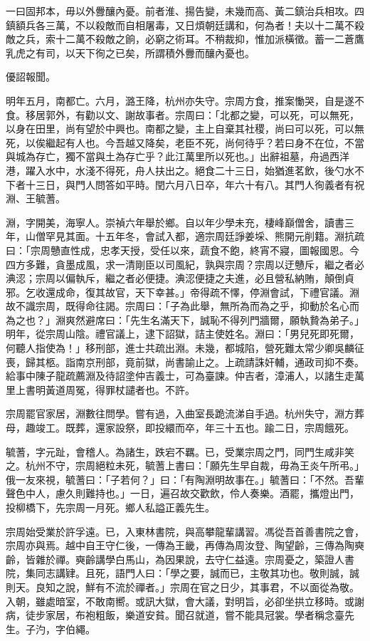 \begin{pinyinscope}
一曰固邦本，毋以外釁釀內憂。前者淮、揚告變，未幾而高、黃二鎮治兵相攻。四鎮額兵各三萬，不以殺敵而自相屠毒，又日煩朝廷講和，何為者！夫以十二萬不殺敵之兵，索十二萬不殺敵之餉，必窮之術耳。不稍裁抑，惟加派橫徵。蓄一二蒼鷹乳虎之有司，以天下徇之已矣，所謂積外釁而釀內憂也。

優詔報聞。

明年五月，南都亡。六月，潞王降，杭州亦失守。宗周方食，推案慟哭，自是遂不食。移居郭外，有勸以文、謝故事者。宗周曰：「北都之變，可以死，可以無死，以身在田里，尚有望於中興也。南都之變，主上自棄其社稷，尚曰可以死，可以無死，以俟繼起有人也。今吾越又降矣，老臣不死，尚何待乎？若曰身不在位，不當與城為存亡，獨不當與土為存亡乎？此江萬里所以死也。」出辭祖墓，舟過西洋港，躍入水中，水淺不得死，舟人扶出之。絕食二十三日，始猶進茗飲，後勺水不下者十三日，與門人問答如平時。閏六月八日卒，年六十有八。其門人徇義者有祝淵、王毓蓍。

淵，字開美，海寧人。崇禎六年舉於鄉。自以年少學未充，棲峰巔僧舍，讀書三年，山僧罕見其面。十五年冬，會試入都，適宗周廷諍姜埰、熊開元削籍。淵抗疏曰：「宗周戇直性成，忠孝天授，受任以來，蔬食不飽，終宵不寢，圖報國恩。今四方多難，貪墨成風，求一清剛臣以司風紀，孰與宗周？宗周以迂戇斥，繼之者必淟涊；宗周以偏執斥，繼之者必便捷。淟涊便捷之夫進，必且營私納賄，顛倒貞邪。乞收還成命，復其故官，天下幸甚。」帝得疏不懌，停淵會試，下禮官議。淵故不識宗周，既得命往謁。宗周曰：「子為此舉，無所為而為之乎，抑動於名心而為之也？」淵爽然避席曰：「先生名滿天下，誠恥不得列門牆爾，願執贄為弟子。」明年，從宗周山陰。禮官議上，逮下詔獄，詰主使姓名。淵曰：「男兒死即死爾，何聽人指使為！」移刑部，進士共疏出淵。未幾，都城陷，營死難太常少卿吳麟征喪，歸其柩。詣南京刑部，竟前獄，尚書諭止之。上疏請誅奸輔，通政司抑不奏。給事中陳子龍疏薦淵及待詔塗仲吉義士，可為臺諫。仲吉者，漳浦人，以諸生走萬里上書明黃道周冤，得罪杖譴者也。不許。

宗周罷官家居，淵數往問學。嘗有過，入曲室長跪流涕自手過。杭州失守，淵方葬母，趣竣工。既葬，還家設祭，即投繯而卒，年三十五也。踰二日，宗周餓死。

毓蓍，字元趾，會稽人。為諸生，跌宕不羈。已，受業宗周之門，同門生咸非笑之。杭州不守，宗周絕粒未死，毓蓍上書曰：「願先生早自裁，毋為王炎午所弔。」俄一友來視，毓蓍曰：「子若何？」曰：「有陶淵明故事在。」毓蓍曰：「不然。吾輩聲色中人，慮久則難持也。」一日，遍召故交歡飲，伶人奏樂。酒罷，攜燈出門，投柳橋下，先宗周一月死。鄉人私謚正義先生。

宗周始受業於許孚遠。已，入東林書院，與高攀龍輩講習。馮從吾首善書院之會，宗周亦與焉。越中自王守仁後，一傳為王畿，再傳為周汝登、陶望齡，三傳為陶奭齡，皆雜於禪。奭齡講學白馬山，為因果說，去守仁益遠。宗周憂之，築證人書院，集同志講肄。且死，語門人曰：「學之要，誠而已，主敬其功也。敬則誠，誠則天。良知之說，鮮有不流於禪者。」宗周在官之日少，其事君，不以面從為敬。入朝，雖處暗室，不敢南嚮。或訊大獄，會大議，對明旨，必卻坐拱立移時。或謝病，徒步家居，布袍粗飯，樂道安貧。聞召就道，嘗不能具冠裳。學者稱念臺先生。子汋，字伯繩。


\end{pinyinscope}
